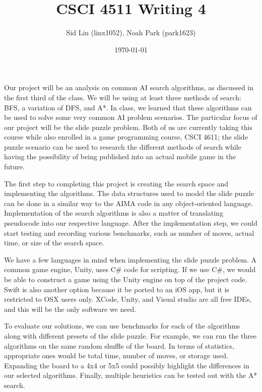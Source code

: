 \documentclass{article}
\title{CSCI 4511 Writing 4}
\date{\today}
\author{Sid Lin (linx1052), Noah Park (park1623)}
\begin{document}
\maketitle

Our project will be an analysis on common AI search algorithms, as discussed in the first third of the class. We will be using at least three methods of search: BFS, a variation of DFS, and A*. In class, we learned that these algorithms can be used to solve some very common AI problem scenarios. The particular focus of our project will be the slide puzzle problem. Both of us are currently taking this course while also enrolled in a game programming course, CSCI 4611; the slide puzzle scenario can be used to research the different methods of search while having the possibility of being published into an actual mobile game in the future. 
\newline

The first step to completing this project is creating the search space and implementing the algorithms. The data structures used to model the slide puzzle can be done in a similar way to the AIMA code in any object-oriented language. Implementation of the search algorithms is also a matter of translating pseudocode into our respective language. After the implementation step, we could start testing and recording various benchmarks, such as number of moves, actual time, or size of the search space.
\newline

We have a few languages in mind when implementing the slide puzzle problem. A common game engine, Unity, uses C\# code for scripting. If we use C\#, we would be able to construct a game using the Unity engine on top of the project code. Swift is also another option because it be ported to an iOS app, but it is restricted to OSX users only. XCode, Unity, and Visual studio are all free IDEs, and this will be the only software we need.
\newline

To evaluate our solutions, we can use benchmarks for each of the algorithms along with different presets of the slide puzzle. For example, we can run the three algorithms on the same random shuffle of the board. In terms of statistics, appropriate ones would be total time, number of moves, or storage used. Expanding the board to a 4x4 or 5x5 could possibly highlight the differences in our selected algorithms. Finally, multiple heuristics can be tested out with the A* search.

\end{document}
